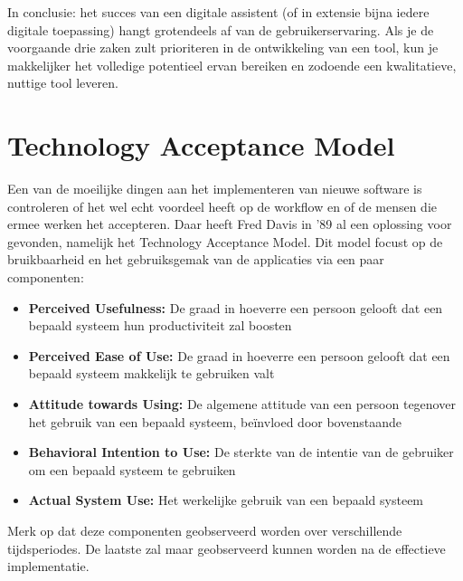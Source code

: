 In conclusie: het succes van een digitale assistent (of in extensie bijna iedere digitale toepassing) hangt grotendeels af van de gebruikerservaring.
Als je de voorgaande drie zaken zult prioriteren in de ontwikkeling van een tool, kun je makkelijker het volledige potentieel ervan bereiken en zodoende een kwalitatieve, nuttige tool leveren.

\section{Technology Acceptance Model}
Een van de moeilijke dingen aan het implementeren van nieuwe software is controleren of het wel echt voordeel heeft op de workflow en of de mensen die ermee werken het accepteren.
Daar heeft Fred Davis in '89 al een oplossing voor gevonden, namelijk het Technology Acceptance Model.
Dit model focust op de bruikbaarheid en het gebruiksgemak van de applicaties via een paar componenten:

\begin{itemize}
	\item \textbf{Perceived Usefulness:} De graad in hoeverre een persoon gelooft dat een bepaald systeem hun productiviteit zal boosten
	\item \textbf{Perceived Ease of Use:} De graad in hoeverre een persoon gelooft dat een bepaald systeem makkelijk te gebruiken valt
	\item \textbf{Attitude towards Using:} De algemene attitude van een persoon tegenover het gebruik van een bepaald systeem, beïnvloed door bovenstaande
	\item \textbf{Behavioral Intention to Use:} De sterkte van de intentie van de gebruiker om een bepaald systeem te gebruiken
	\item \textbf{Actual System Use:} Het werkelijke gebruik van een bepaald systeem
\end{itemize}

Merk op dat deze componenten geobserveerd worden over verschillende tijdsperiodes. De laatste zal maar geobserveerd kunnen worden na de effectieve implementatie.

